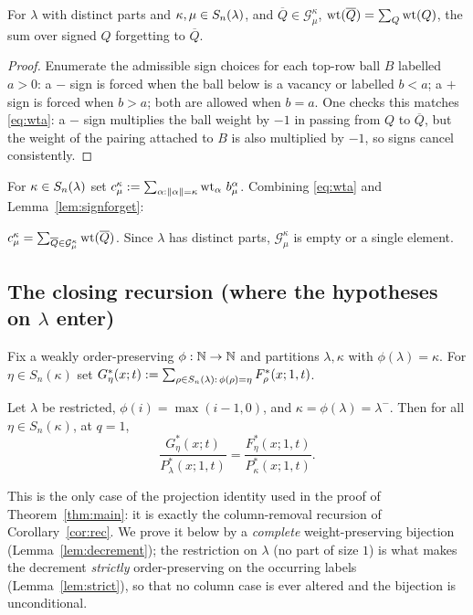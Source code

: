 \begin{qthreelemma}\label{lem:signforget}
For $\lambda$ with distinct parts and $\kappa,\mu\in S_n(\lambda)$, and $\overline Q\in\mathcal G^\kappa_\mu$,
$\operatorname{wt}(\overline Q)=\sum_Q\operatorname{wt}(Q)$, the sum over signed $Q$ forgetting to $\overline Q$.
\end{qthreelemma}

\begin{proof}
Enumerate the admissible sign choices for each top-row ball $B$ labelled $a>0$:
a $-$ sign is forced when the ball below is a vacancy or labelled $b<a$; a $+$
sign is forced when $b>a$; both are allowed when $b=a$. One checks this matches
\eqref{eq:wta}: a $-$ sign multiplies the ball weight by $-1$ in passing from
$Q$ to $\overline Q$, but the weight of the pairing attached to $B$ is also
multiplied by $-1$, so signs cancel consistently.
\end{proof}

For $\kappa\in S_n(\lambda)$ set $c^\kappa_\mu:=\sum_{\alpha:\|\alpha\|=\kappa}\operatorname{wt}_\alpha\,b^\alpha_\mu$.
Combining \eqref{eq:wta} and Lemma~\ref{lem:signforget}:

\begin{qthreelemma}\label{lem:ckm}
$c^\kappa_\mu=\sum_{\overline Q\in\mathcal G^\kappa_\mu}\operatorname{wt}(\overline Q)$. Since $\lambda$ has distinct
parts, $\mathcal G^\kappa_\mu$ is empty or a single element.
\end{qthreelemma}

\subsection*{The closing recursion (where the hypotheses on $\lambda$ enter)}

Fix a weakly order-preserving $\phi:\mathbb{N}\to\mathbb{N}$ and partitions $\lambda,\kappa$ with
$\phi(\lambda)=\kappa$. For $\eta\in S_n(\kappa)$ set
$G^*_\eta(x;t):=\sum_{\rho\in S_n(\lambda):\,\phi(\rho)=\eta}F^*_\rho(x;1,t)$.

\begin{qthreetheorem}\label{thm:G}
Let $\lambda$ be restricted, $\phi(i)=\max(i-1,0)$, and $\kappa=\phi(\lambda)=\lambda^-$.
Then for all $\eta\in S_n(\kappa)$, at $q=1$,
\[
\frac{G^*_\eta(x;t)}{P^*_\lambda(x;1,t)}=\frac{F^*_\eta(x;1,t)}{P^*_\kappa(x;1,t)} .
\]
\end{qthreetheorem}

This is the only case of the projection identity used in the proof of
Theorem~\ref{thm:main}: it is exactly the column-removal recursion of
Corollary~\ref{cor:rec}. We prove it below by a \emph{complete}
weight-preserving bijection (Lemma~\ref{lem:decrement}); the restriction on
$\lambda$ (no part of size $1$) is what makes the decrement \emph{strictly}
order-preserving on the occurring labels (Lemma~\ref{lem:strict}), so that no
column case is ever altered and the bijection is unconditional.

